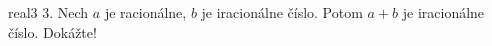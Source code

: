 \begin{defproblem}{real3}
3. Nech $a$ je racionálne, $b$ je iracionálne číslo. Potom $a + b$ je
iracionálne číslo. Dokážte!
\end{defproblem}
